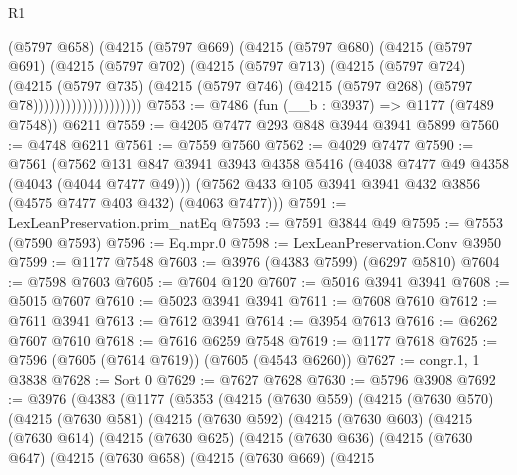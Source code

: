 \begin{lexlean}{R1}
\begin{coremodule}
                        (@5797 @658)
                        (@4215
                          (@5797 @669)
                          (@4215
                            (@5797 @680)
                            (@4215
                              (@5797 @691)
                              (@4215
                                (@5797 @702)
                                (@4215
                                  (@5797 @713)
                                  (@4215
                                    (@5797 @724)
                                    (@4215
                                      (@5797 @735)
                                      (@4215
                                        (@5797 @746)
                                        (@4215 (@5797 @268) (@5797 @78))))))))))))))))))))
@7553 := @7486 (fun (__b : @3937) => @1177 (@7489 @7548)) @6211
@7559 := @4205 @7477 @293 @848 @3944 @3941 @5899
@7560 := @4748 @6211
@7561 := @7559 @7560
@7562 := @4029 @7477
@7590 := @7561
    (@7562
      @131
      @847
      @3941
      @3943
      @4358
      @5416
      (@4038 @7477 @49 @4358 (@4043 (@4044 @7477 @49)))
      (@7562 @433 @105 @3941 @3941 @432 @3856 (@4575 @7477 @403 @432) (@4063 @7477)))
@7591 := LexLeanPreservation.prim_natEq
@7593 := @7591 @3844 @49
@7595 := @7553 (@7590 @7593)
@7596 := Eq.mpr.{0}
@7598 := LexLeanPreservation.Conv @3950
@7599 := @1177 @7548
@7603 := @3976 (@4383 @7599) (@6297 @5810)
@7604 := @7598 @7603
@7605 := @7604 @120
@7607 := @5016 @3941 @3941
@7608 := @5015 @7607
@7610 := @5023 @3941 @3941
@7611 := @7608 @7610
@7612 := @7611 @3941
@7613 := @7612 @3941
@7614 := @3954 @7613
@7616 := @6262 @7607 @7610
@7618 := @7616 @6259 @7548
@7619 := @1177 @7618
@7625 := @7596 (@7605 (@7614 @7619)) (@7605 (@4543 @6260))
@7627 := congr.{1, 1} @3838
@7628 := Sort 0
@7629 := @7627 @7628
@7630 := @5796 @3908
@7692 := @3976
    (@4383
      (@1177
        (@5353
          (@4215
            (@7630 @559)
            (@4215
              (@7630 @570)
              (@4215
                (@7630 @581)
                (@4215
                  (@7630 @592)
                  (@4215
                    (@7630 @603)
                    (@4215
                      (@7630 @614)
                      (@4215
                        (@7630 @625)
                        (@4215
                          (@7630 @636)
                          (@4215
                            (@7630 @647)
                            (@4215
                              (@7630 @658)
                              (@4215
                                (@7630 @669)
                                (@4215

\end{coremodule}
\end{lexlean}
